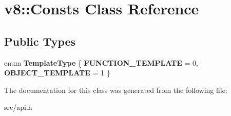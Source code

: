 \hypertarget{classv8_1_1_consts}{}\section{v8\+:\+:Consts Class Reference}
\label{classv8_1_1_consts}
\subsection*{Public Types}
\begin{DoxyCompactItemize}
\item 
\hypertarget{classv8_1_1_consts_afcb83e41645c657b000300603982965c}{}enum {\bfseries Template\+Type} \{ {\bfseries F\+U\+N\+C\+T\+I\+O\+N\+\_\+\+T\+E\+M\+P\+L\+A\+T\+E} = 0, 
{\bfseries O\+B\+J\+E\+C\+T\+\_\+\+T\+E\+M\+P\+L\+A\+T\+E} = 1
 \}\label{classv8_1_1_consts_afcb83e41645c657b000300603982965c}

\end{DoxyCompactItemize}


The documentation for this class was generated from the following file\+:\begin{DoxyCompactItemize}
\item 
src/api.\+h\end{DoxyCompactItemize}
